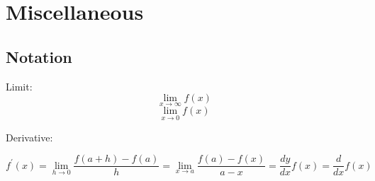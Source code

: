 \section{Miscellaneous}
\subsection{Notation}
\noindent

Limit:
$$\lim_{x \to \infty} f(x)$$
$$\lim_{x \to 0} f(x)$$

Derivative:

$$
f^\prime(x) =
\lim_{h \to 0} \frac{f(a + h) - f(a)}{h} =
\lim_{x \to a} \frac{f(a) - f(x)}{a - x} =
\frac{dy}{dx}f(x) =
\frac{d}{dx}f(x)
$$
